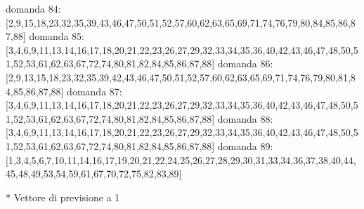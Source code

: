 domanda 84:[2,9,15,18,23,32,35,39,43,46,47,50,51,52,57,60,62,63,65,69,71,74,76,79,80,84,85,86,87,88]
domanda 85:[3,4,6,9,11,13,14,16,17,18,20,21,22,23,26,27,29,32,33,34,35,36,40,42,43,46,47,48,50,51,52,53,61,62,63,67,72,74,80,81,82,84,85,86,87,88]
domanda 86:[2,9,13,15,18,23,32,35,39,42,43,46,47,50,51,52,57,60,62,63,65,69,71,74,76,79,80,81,84,85,86,87,88]
domanda 87:[3,4,6,9,11,13,14,16,17,18,20,21,22,23,26,27,29,32,33,34,35,36,40,42,43,46,47,48,50,51,52,53,61,62,63,67,72,74,80,81,82,84,85,86,87,88]
domanda 88:[3,4,6,9,11,13,14,16,17,18,20,21,22,23,26,27,29,32,33,34,35,36,40,42,43,46,47,48,50,51,52,53,61,62,63,67,72,74,80,81,82,84,85,86,87,88]
domanda 89:[1,3,4,5,6,7,10,11,14,16,17,19,20,21,22,24,25,26,27,28,29,30,31,33,34,36,37,38,40,44,45,48,49,53,54,59,61,67,70,72,75,82,83,89]

* Vettore di previsione a 1

